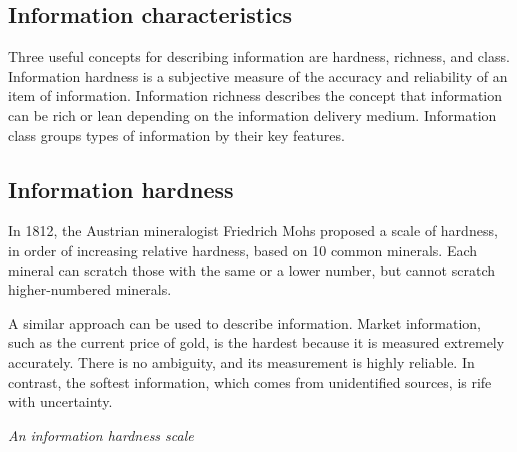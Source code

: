 \documentclass[
]{article}
\begin{document}
\hypertarget{information-characteristics}{%
\subsection*{Information characteristics}\label{information-characteristics}}

Three useful concepts for describing information are hardness, richness,
and class. Information hardness is a subjective measure of the accuracy
and reliability of an item of information. Information richness
describes the concept that information can be rich or lean depending on
the information delivery medium. Information class groups types of
information by their key features.

\hypertarget{information-hardness}{%
\subsection*{Information hardness}\label{information-hardness}}

In 1812, the Austrian mineralogist Friedrich Mohs proposed a scale of
hardness, in order of increasing relative hardness, based on 10 common
minerals. Each mineral can scratch those with the same or a lower
number, but cannot scratch higher-numbered minerals.

A similar approach can be used to describe information. Market
information, such as the current price of gold, is the hardest because
it is measured extremely accurately. There is no ambiguity, and its
measurement is highly reliable. In contrast, the softest information,
which comes from unidentified sources, is rife with uncertainty.

\emph{An information hardness scale}
\end{document}
